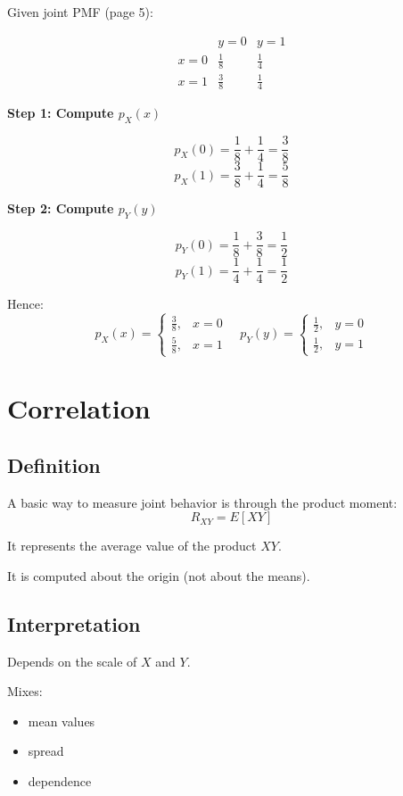 \documentclass[12pt]{article}
\begin{document}
Given joint PMF (page 5):

\[
\begin{array}{c|cc}
 & y=0 & y=1 \\
\hline
x=0 & \frac{1}{8} & \frac{1}{4} \\
x=1 & \frac{3}{8} & \frac{1}{4}
\end{array}
\]

\textbf{Step 1: Compute $p_X(x)$}

\[
p_X(0) = \frac{1}{8} + \frac{1}{4} = \frac{3}{8}
\]
\[
p_X(1) = \frac{3}{8} + \frac{1}{4} = \frac{5}{8}
\]

\textbf{Step 2: Compute $p_Y(y)$}

\[
p_Y(0) = \frac{1}{8} + \frac{3}{8} = \frac{1}{2}
\]
\[
p_Y(1) = \frac{1}{4} + \frac{1}{4} = \frac{1}{2}
\]

Hence:
\[
p_X(x) =
\begin{cases}
\frac{3}{8}, & x = 0 \\
\frac{5}{8}, & x = 1
\end{cases}
\quad
p_Y(y) =
\begin{cases}
\frac{1}{2}, & y = 0 \\
\frac{1}{2}, & y = 1
\end{cases}
\]

\section{Correlation}

\subsection{Definition}

A basic way to measure joint behavior is through the product moment:
\[
R_{XY} = E[XY]
\]

It represents the average value of the product $XY$.

It is computed about the origin (not about the means).

\subsection{Interpretation}

Depends on the scale of $X$ and $Y$.

Mixes:
\begin{itemize}
    \item mean values
    \item spread
    \item dependence
\end{itemize}
\end{document}
